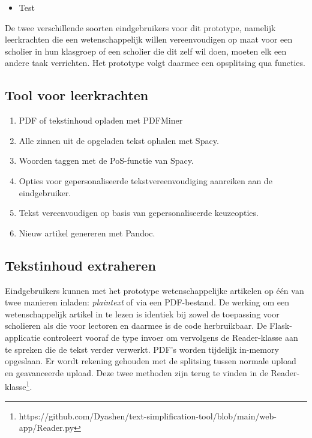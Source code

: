 \begin{itemize}
\item Test
\end{itemize}


De twee verschillende soorten eindgebruikers voor dit prototype, namelijk leerkrachten die een wetenschappelijk willen vereenvoudigen op maat voor een scholier in hun klasgroep of een scholier die dit zelf wil doen, moeten elk een andere taak verrichten. Het prototype volgt daarmee een opsplitsing qua functies.


\subsection{Tool voor leerkrachten}

\begin{enumerate}
	\item PDF of tekstinhoud opladen met PDFMiner
	\item Alle zinnen uit de opgeladen tekst ophalen met Spacy.
	\item Woorden taggen met de PoS-functie van Spacy.
	\item Opties voor gepersonaliseerde tekstvereenvoudiging aanreiken aan de eindgebruiker.
	\item Tekst vereenvoudigen op basis van gepersonaliseerde keuzeopties.
	\item Nieuw artikel genereren met Pandoc.
\end{enumerate}

\subsection{Tekstinhoud extraheren}

Eindgebruikers kunnen met het prototype wetenschappelijke artikelen op één van twee manieren inladen: \textit{plaintext} of via een PDF-bestand. De werking om een wetenschappelijk artikel in te lezen is identiek bij zowel de toepassing voor scholieren als die voor lectoren en daarmee is de code herbruikbaar. De Flask-applicatie controleert vooraf de type invoer om vervolgens de Reader-klasse aan te spreken die de tekst verder verwerkt. PDF's worden tijdelijk in-memory opgeslaan. Er wordt rekening gehouden met de splitsing tussen normale upload en geavanceerde upload. Deze twee methoden zijn terug te vinden in de Reader-klasse\footnote{https://github.com/Dyashen/text-simplification-tool/blob/main/web-app/Reader.py}.

